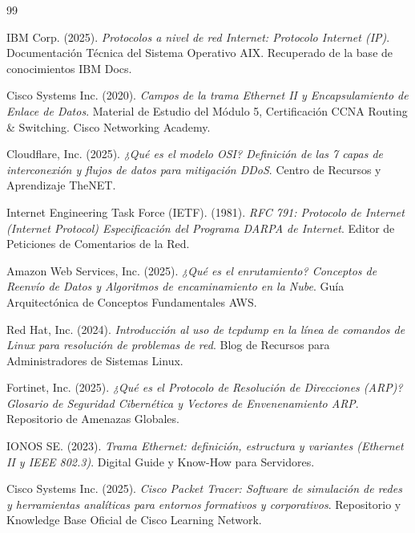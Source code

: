 \documentclass[a4paper,12pt]{article}
\begin{document}
\newpage
\begin{thebibliography}{99}

IBM Corp. (2025). \textit{Protocolos a nivel de red Internet: Protocolo Internet (IP)}. Documentación Técnica del Sistema Operativo AIX. Recuperado de la base de conocimientos IBM Docs.

Cisco Systems Inc. (2020). \textit{Campos de la trama Ethernet II y Encapsulamiento de Enlace de Datos}. Material de Estudio del Módulo 5, Certificación CCNA Routing \& Switching. Cisco Networking Academy.

Cloudflare, Inc. (2025). \textit{¿Qué es el modelo OSI? Definición de las 7 capas de interconexión y flujos de datos para mitigación DDoS}. Centro de Recursos y Aprendizaje TheNET.

Internet Engineering Task Force (IETF). (1981). \textit{RFC 791: Protocolo de Internet (Internet Protocol) Especificación del Programa DARPA de Internet}. Editor de Peticiones de Comentarios de la Red.

Amazon Web Services, Inc. (2025). \textit{¿Qué es el enrutamiento? Conceptos de Reenvío de Datos y Algoritmos de encaminamiento en la Nube}. Guía Arquitectónica de Conceptos Fundamentales AWS.

Red Hat, Inc. (2024). \textit{Introducción al uso de tcpdump en la línea de comandos de Linux para resolución de problemas de red}. Blog de Recursos para Administradores de Sistemas Linux.

Fortinet, Inc. (2025). \textit{¿Qué es el Protocolo de Resolución de Direcciones (ARP)? Glosario de Seguridad Cibernética y Vectores de Envenenamiento ARP}. Repositorio de Amenazas Globales.

IONOS SE. (2023). \textit{Trama Ethernet: definición, estructura y variantes (Ethernet II y IEEE 802.3)}. Digital Guide y Know-How para Servidores.

Cisco Systems Inc. (2025). \textit{Cisco Packet Tracer: Software de simulación de redes y herramientas analíticas para entornos formativos y corporativos}. Repositorio y Knowledge Base Oficial de Cisco Learning Network.

\end{thebibliography}
\end{document}
